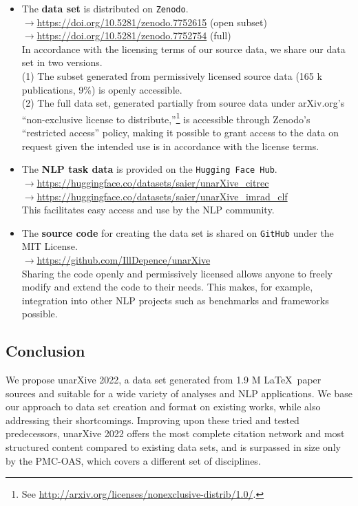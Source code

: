 \begin{itemize}
    \item The \textbf{data set} is distributed on \texttt{Zenodo}.\\
        $\rightarrow$\url{https://doi.org/10.5281/zenodo.7752615} (open subset)\\
        $\rightarrow$\url{https://doi.org/10.5281/zenodo.7752754} (full)\\
        In accordance with the licensing terms of our source data, we share our data set in two versions.\\
        (1) The subset generated from permissively licensed source data (165 k publications, 9\%) is openly accessible.\\
        (2) The full data set, generated partially from source data under arXiv.org's ``non-exclusive license to distribute,''\footnote{See \url{http://arxiv.org/licenses/nonexclusive-distrib/1.0/}.} is accessible through Zenodo's ``restricted access'' policy, %
making it possible to grant access to the data on request given the intended use is in accordance with the license terms.
    \item The \textbf{NLP task data} is provided on the \texttt{Hugging Face Hub}.\\
        $\rightarrow$\url{https://huggingface.co/datasets/saier/unarXive_citrec}\\
        $\rightarrow$\url{https://huggingface.co/datasets/saier/unarXive_imrad_clf}\\
        This facilitates easy access and use by the NLP community.
    \item The \textbf{source code} for creating the data set is shared on \texttt{GitHub} under the MIT License.\\
        $\rightarrow$\url{https://github.com/IllDepence/unarXive}\\
        Sharing the code openly and permissively licensed allows anyone to freely modify and extend the code to their needs. This makes, for example, integration into other NLP projects such as benchmarks and frameworks possible.
\end{itemize}

\subsection{Conclusion}
We propose unarXive 2022, a data set generated from 1.9 M \LaTeX\ paper sources and suitable for a wide variety of analyses and NLP applications. We base our approach to data set creation and format on existing works, while also addressing their shortcomings. Improving upon these tried and tested predecessors, unarXive 2022 offers the most complete citation network and most structured content compared to existing data sets, and is surpassed in size only by the PMC-OAS, which covers a different set of disciplines.

